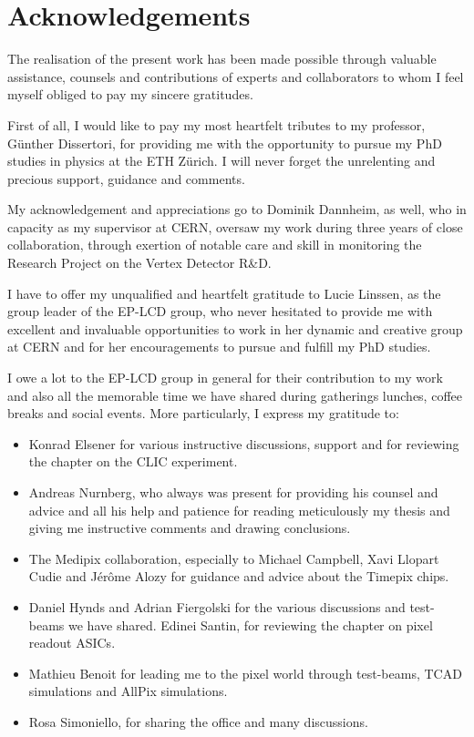 \chapter{Acknowledgements}
\label{sec:ack}

The realisation of the present work has been made possible through
valuable assistance, counsels and contributions of experts and
collaborators to whom I feel myself obliged to pay my sincere
gratitudes.

First of all, I would like to pay my most heartfelt tributes to my
professor, Günther Dissertori, for providing me with the opportunity
to pursue my PhD studies in physics at the ETH Zürich. I will never
forget the unrelenting and precious support, guidance and comments.


My acknowledgement and appreciations go to Dominik Dannheim, as well,
who in capacity as my supervisor at CERN, oversaw my work during three
years of close collaboration, through exertion of notable care and
skill in monitoring the Research Project on the Vertex Detector R\&D.

I have to offer my unqualified and heartfelt gratitude to Lucie
Linssen, as the group leader of the EP-LCD group, who never hesitated
to provide me with excellent and invaluable opportunities to work in
her dynamic and creative group at CERN and for her encouragements to
pursue and fulfill my PhD studies.

I owe a lot to the EP-LCD group in general for their contribution to
my work and also all the memorable time we have shared during
gatherings lunches, coffee breaks and social events. More
particularly, I express my gratitude to:

\begin{itemize}
\item Konrad Elsener for various instructive discussions, support and
  for reviewing the chapter on the CLIC experiment.

\item Andreas Nurnberg, who always was present for providing his
  counsel and advice and all his help and patience for reading
  meticulously my thesis and giving me instructive comments and
  drawing conclusions.

\item The Medipix collaboration, especially to Michael Campbell, Xavi
  Llopart Cudie and Jérôme Alozy for guidance and advice about the
  Timepix chips.

\item Daniel Hynds and Adrian Fiergolski for the various discussions
  and test-beams we have shared. Edinei Santin, for reviewing the
  chapter on pixel readout ASICs.

\item Mathieu Benoit for leading me to the pixel world through
  test-beams, TCAD simulations and AllPix simulations.

\item Rosa Simoniello, for sharing the office and many discussions.
\end{itemize}

